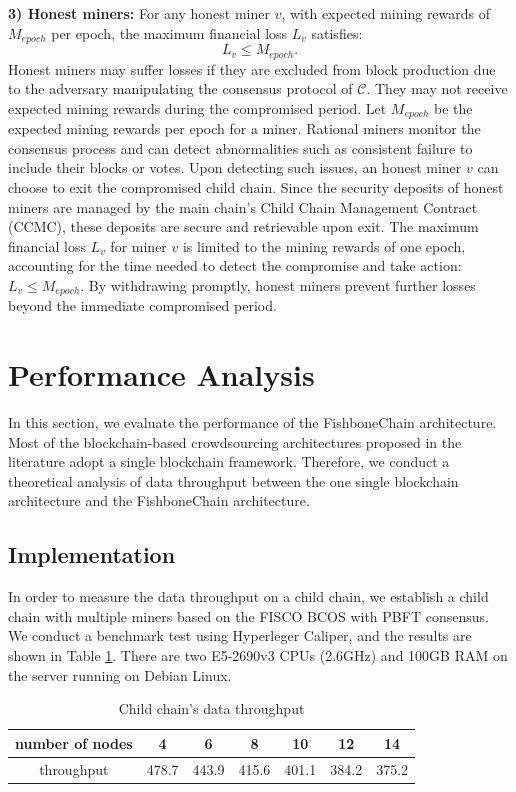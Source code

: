 \documentclass[10pt,journal]{IEEEtran}
\begin{document}
\noindent\textbf{3) Honest miners:} For any honest miner $v$, with expected mining rewards of $M_{epoch}$ per epoch, the maximum financial loss $L_v$ satisfies:
    \begin{equation}
        L_v \leq M_{epoch}.
    \end{equation}
    Honest miners may suffer losses if they are excluded from block production due to the adversary manipulating the consensus protocol of $\mathcal{C}$. They may not receive expected mining rewards during the compromised period. Let $M_{epoch}$ be the expected mining rewards per epoch for a miner. Rational miners monitor the consensus process and can detect abnormalities such as consistent failure to include their blocks or votes. Upon detecting such issues, an honest miner $v$ can choose to exit the compromised child chain. Since the security deposits of honest miners are managed by the main chain's Child Chain Management Contract (CCMC), these deposits are secure and retrievable upon exit. The maximum financial loss $L_v$ for miner $v$ is limited to the mining rewards of one epoch, accounting for the time needed to detect the compromise and take action: $L_v \leq M_{epoch}$. By withdrawing promptly, honest miners prevent further losses beyond the immediate compromised period.
    
\section{Performance Analysis}\label{section:performance_analysis}
In this section, we evaluate the performance of the FishboneChain architecture. Most of the blockchain-based crowdsourcing architectures proposed in the literature adopt a single blockchain framework. Therefore, we conduct a theoretical analysis of data throughput between the one single blockchain architecture and the FishboneChain architecture.

\subsection{Implementation}
In order to measure the data throughput on a child chain, we establish a child chain with multiple miners based on the FISCO BCOS with PBFT consensus. We conduct a benchmark test using Hyperleger Caliper, and the results are shown in Table \ref{tab:childchain_throughput}. There are two E5-2690v3 CPUs (2.6GHz) and 100GB RAM on the server running on Debian Linux.

\begin{table}[htbp]
    \centering
    \caption{Child chain's data throughput}
    \label{tab:childchain_throughput}
    \begin{tabular}{ccccccc}
        \toprule
        \noalign{\smallskip}
        number of nodes & 4     & 6     & 8     & 10    & 12    & 14    \\
        \midrule
        \noalign{\smallskip}
        throughput      & 478.7 & 443.9 & 415.6 & 401.1 & 384.2 & 375.2 \\
        \bottomrule
    \end{tabular}
\end{table}
\end{document}
